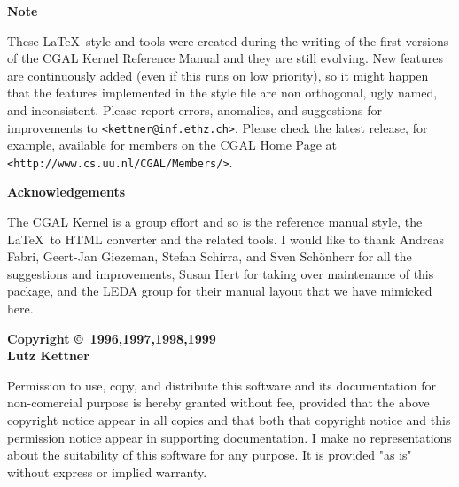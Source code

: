 

{\bf Note}

{\small These \LaTeX\ style and tools were created during the writing
  of the first versions of the CGAL Kernel Reference Manual and they
  are still evolving. New features are continuously added (even if
  this runs on low priority), so it might happen that the features
  implemented in the style file are non orthogonal, ugly named, and
  inconsistent. Please report errors, anomalies, and suggestions for
  improvements to {\tt <kettner@inf.ethz.ch>}. Please check the latest
  release, for example, available for members on the CGAL Home Page at
  {\tt <http://www.cs.uu.nl/CGAL/Members/>}.}\vspace{2ex}

{\bf Acknowledgements} 

{\small The CGAL Kernel is a group effort \cite{Fabri96,Fabri99} and
  so is the reference manual style, the \LaTeX\ to HTML converter and
  the related tools. I would like to thank Andreas Fabri, Geert-Jan
  Giezeman, Stefan Schirra, and Sven Sch\"onherr for all the
  suggestions and improvements, Susan Hert for taking over maintenance
  of this package, and the LEDA group for their manual
  layout \cite{Naeher95} that we have mimicked here.}\vspace{2ex}

{\bf Copyright \copyright\ 1996,1997,1998,1999\\
Lutz Kettner}

{\small Permission to use, copy, and distribute this software and its
  documentation for non-comercial purpose is hereby granted without
  fee, provided that the above copyright notice appear in all copies
  and that both that copyright notice and this permission notice
  appear in supporting documentation.  I make no representations about
  the suitability of this software for any purpose.  It is provided
  "as is" without express or implied warranty.}


